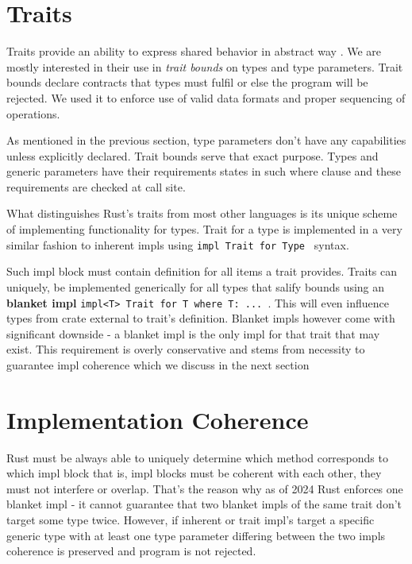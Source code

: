 \section{Traits}

Traits provide an ability to express shared behavior in abstract way \cite{rustbook}. We are mostly interested in their use in \textit{trait bounds} on types and type parameters.
Trait bounds declare contracts that types must fulfil or else the program will be rejected. 
We used it to enforce use of valid data formats and proper sequencing of operations.

As mentioned in the previous section, type parameters don't have any capabilities unless explicitly declared. Trait bounds serve that exact purpose.
Types and generic parameters have their requirements states in such where clause and these requirements are checked at call site.

What distinguishes Rust's traits from most other languages is its unique scheme of implementing functionality for types.
Trait for a type is implemented in a very similar fashion to inherent impls using \texttt{impl Trait for Type } syntax.

Such impl block must contain definition for all items a trait provides.
Traits can uniquely, be implemented generically for all types that salify bounds using an \textbf{blanket impl} \texttt{impl<T> Trait for T where T: ... }.
This will even influence types from crate external to trait's definition. Blanket impls however come with significant downside - a blanket impl is the only impl for that trait that may exist.
This requirement is overly conservative and stems from necessity to guarantee impl coherence which we discuss in the next section

\section{Implementation Coherence}

Rust must be always able to uniquely determine which method corresponds to which impl block that is, impl blocks must be coherent with each other, they must not interfere or overlap.
That's the reason why as of 2024 Rust enforces one blanket impl - it cannot guarantee that two blanket impls of the same trait don't target some type twice.
However, if inherent or trait impl's target a specific generic type with at least one type parameter differing between the two impls coherence is preserved and program is not rejected.

